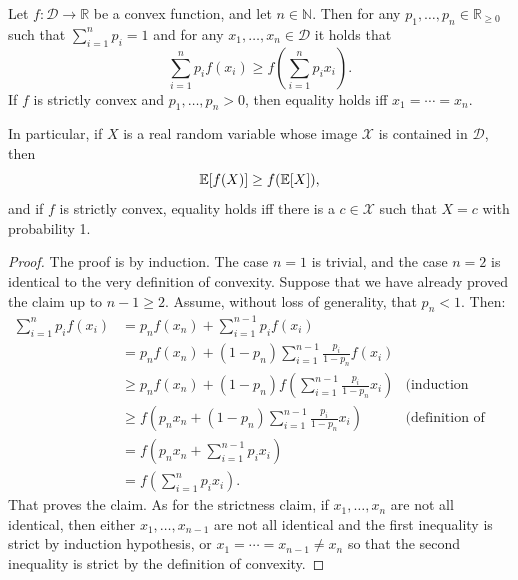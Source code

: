 \begin{theorem} Let $f : \mathcal{D} \to \mathbb{R}$ be a convex function, and let $n \in \mathbb{N}$. Then for any $p_1, \ldots, p_n \in \mathbb{R}_{\geq 0}$ such that $\sum_{i=1}^n p_i = 1$ and for any $x_1, \ldots, x_n \in \mathcal{D}$ it holds that
\[
\sum_{i=1}^n p_if(x_i) \geq f\left(\sum_{i=1}^np_ix_i\right).
\]
If $f$ is strictly convex and $p_1, \ldots, p_n > 0$, then equality holds iff $x_1 = \cdots = x_n$.

In particular, if $X$ is a real random variable whose image $\mathcal{X}$ is contained in $\mathcal{D}$, then
\[
\mathbb{E}[f(X)] \geq f(\mathbb{E}[X]),
\]
and if $f$ is strictly convex, equality holds iff there is a $c \in \mathcal{X}$ such that $X = c$ with probability 1.
\end{theorem}
\begin{proof}
The proof is by induction. The case $n=1$ is trivial, and the case $n=2$ is identical to the very definition of convexity. Suppose that we have already proved the claim up to $n-1 \geq 2$. Assume, without loss of generality, that $p_n < 1$. Then:
\begin{align}
\sum_{i=1}^n p_i f(x_i) &= p_n f(x_n) + \sum_{i=1}^{n-1} p_i f(x_i)\nonumber\\
&= p_n f(x_n) + (1-p_n)\sum_{i=1}^{n-1} \frac{p_i}{1-p_n} f(x_i)\nonumber\\
&\geq p_n f(x_n) + (1-p_n)f\left(\sum_{i=1}^{n-1} \frac{p_i}{1-p_n} x_i\right) & \mbox{(induction hypothesis)}\nonumber\\
&\geq f\left(p_n x_n + (1-p_n)\sum_{i=1}^{n-1} \frac{p_i}{1-p_n} x_i\right) & \mbox{(definition of convexity)}\nonumber\\
&= f\left(p_n x_n + \sum_{i=1}^{n-1} p_i x_i\right)\nonumber\\
&= f\left(\sum_{i=1}^np_ix_i\right).
\end{align}
That proves the claim. As for the strictness claim, if $x_1, \ldots, x_n$ are not all identical, then either $x_1, \ldots, x_{n-1}$ are not all identical and the first inequality is strict by induction hypothesis, or $x_1 = \cdots = x_{n-1} \neq x_n$ so that the second inequality is strict by the definition of convexity.
\end{proof}


